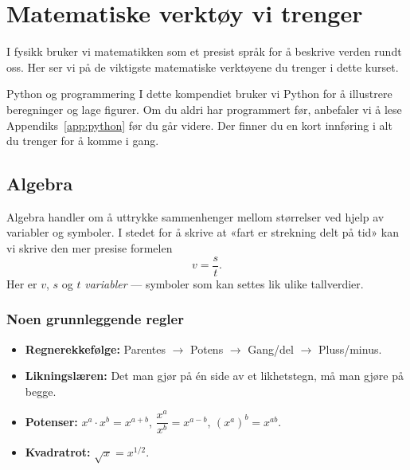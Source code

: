 \newpage
\section{Matematiske verktøy vi trenger}
I fysikk bruker vi matematikken som et presist språk for å beskrive verden rundt oss. Her ser vi på de viktigste matematiske verktøyene du trenger i dette kurset.

\begin{mymerk*}{Python og programmering}
I dette kompendiet bruker vi Python for å illustrere beregninger og lage figurer. Om du aldri har programmert før, anbefaler vi å lese Appendiks~\ref{app:python} før du går videre. Der finner du en kort innføring i alt du trenger for å komme i gang.
\end{mymerk*}

\subsection{Algebra}

Algebra handler om å uttrykke sammenhenger mellom størrelser ved hjelp av variabler og symboler. I stedet for å skrive at «fart er strekning delt på tid» kan vi skrive den mer presise formelen
\[
v = \frac{s}{t}.
\]
Her er $v$, $s$ og $t$ \emph{variabler} — symboler som kan settes lik ulike tallverdier.

\subsubsection*{Noen grunnleggende regler}
\begin{itemize}
    \item \textbf{Regnerekkefølge:} Parentes $\to$ Potens $\to$ Gang/del $\to$ Pluss/minus.
    \item \textbf{Likningslæren:} Det man gjør på én side av et likhetstegn, må man gjøre på begge.
    \item \textbf{Potenser:} $x^a \cdot x^b = x^{a+b}$, \quad $\dfrac{x^a}{x^b} = x^{a-b}$, \quad $(x^a)^b = x^{ab}$.
    \item \textbf{Kvadratrot:} $\sqrt{x} = x^{1/2}$.
\end{itemize}


